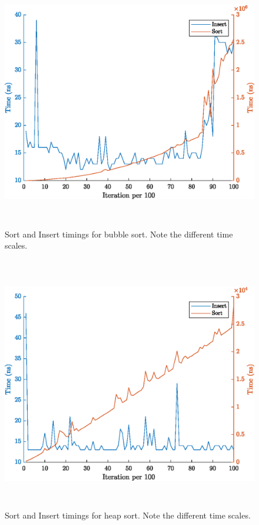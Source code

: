 \documentclass{article}
\begin{document}
\begin{figure}[!htb]
    \centering
    \includegraphics[height=30em]{Bubble.eps}
    \caption{Sort and Insert timings for bubble sort. Note the different time scales.}
\end{figure}

\hfill \break

\begin{figure}[!htb]
    \centering
    \includegraphics[height=30em]{Heap.eps}
    \caption{Sort and Insert timings for heap sort. Note the different time scales.}
\end{figure}
\end{document}
